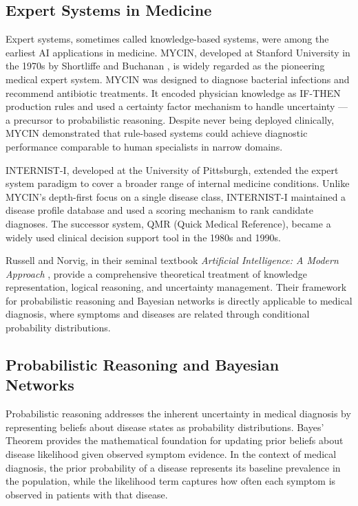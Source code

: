 \documentclass[12pt,a4paper]{article}
\begin{document}
\subsection{Expert Systems in Medicine}

Expert systems, sometimes called knowledge-based systems, were among the earliest AI applications in medicine. MYCIN, developed at Stanford University in the 1970s by Shortliffe and Buchanan \cite{shortliffe}, is widely regarded as the pioneering medical expert system. MYCIN was designed to diagnose bacterial infections and recommend antibiotic treatments. It encoded physician knowledge as IF-THEN production rules and used a certainty factor mechanism to handle uncertainty --- a precursor to probabilistic reasoning. Despite never being deployed clinically, MYCIN demonstrated that rule-based systems could achieve diagnostic performance comparable to human specialists in narrow domains.

INTERNIST-I, developed at the University of Pittsburgh, extended the expert system paradigm to cover a broader range of internal medicine conditions. Unlike MYCIN's depth-first focus on a single disease class, INTERNIST-I maintained a disease profile database and used a scoring mechanism to rank candidate diagnoses. The successor system, QMR (Quick Medical Reference), became a widely used clinical decision support tool in the 1980s and 1990s.

Russell and Norvig, in their seminal textbook \textit{Artificial Intelligence: A Modern Approach} \cite{russell}, provide a comprehensive theoretical treatment of knowledge representation, logical reasoning, and uncertainty management. Their framework for probabilistic reasoning and Bayesian networks is directly applicable to medical diagnosis, where symptoms and diseases are related through conditional probability distributions.

\subsection{Probabilistic Reasoning and Bayesian Networks}

Probabilistic reasoning addresses the inherent uncertainty in medical diagnosis by representing beliefs about disease states as probability distributions. Bayes' Theorem provides the mathematical foundation for updating prior beliefs about disease likelihood given observed symptom evidence. In the context of medical diagnosis, the prior probability of a disease represents its baseline prevalence in the population, while the likelihood term captures how often each symptom is observed in patients with that disease.
\end{document}
